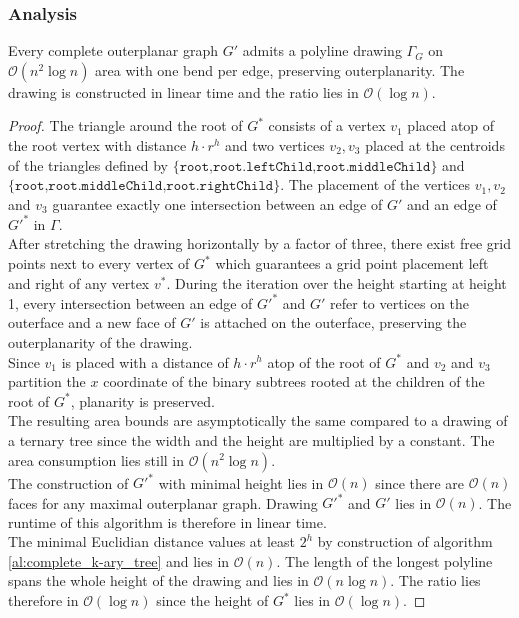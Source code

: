\subsubsection{Analysis}

\begin{theorem}
	Every complete outerplanar graph $G'$ admits a polyline drawing $\Gamma_G$ on $\mathcal{O}(n^2 \log n)$ area with one bend per edge, preserving outerplanarity. The drawing is constructed in linear time and the ratio lies in $\mathcal{O}(\log n)$.
\end{theorem}

\begin{proof}
	The triangle around the root of $G^*$ consists of a vertex $v_1$ placed atop of the root vertex with distance $h\cdot r^h$ and two vertices $v_2,v_3$ placed at the centroids of the triangles defined by $\{\texttt{root,root.leftChild,root.middleChild}\}$ and $\{\texttt{root,root.middleChild,root.rightChild}\}$. The placement of the vertices $v_1,v_2$ and $v_3$ guarantee exactly one intersection between an edge of $G'$ and an edge of $G'^*$ in $\Gamma$.\\
	After stretching the drawing horizontally by a factor of three, there exist free grid points next to every vertex of $G^*$ which guarantees a grid point placement left and right of any vertex $v^*$. During the iteration over the height starting at height 1, every intersection between an edge of $G'^*$ and $G'$ refer to vertices on the outerface and a new face of $G'$ is attached on the outerface, preserving the outerplanarity of the drawing.\\
	Since $v_1$ is placed with a distance of $h\cdot r^h$ atop of the root of $G^*$ and $v_2$ and $v_3$ partition the $x$ coordinate of the binary subtrees rooted at the children of the root of $G^*$, planarity is preserved.\\
	The resulting area bounds are asymptotically the same compared to a drawing of a ternary tree since the width and the height are multiplied by a constant. The area consumption lies still in $\mathcal{O}(n^2 \log n)$.\\
	The construction of $G'^*$ with minimal height lies in $\mathcal{O}(n)$ since there are $\mathcal{O}(n)$ faces for any maximal outerplanar graph. Drawing $G'^*$ and $G'$ lies in $\mathcal{O}(n)$. The runtime of this algorithm is therefore in linear time.\\
	The minimal Euclidian distance values at least $2^h$ by construction of algorithm  \ref{al:complete_k-ary_tree} and lies in $\mathcal{O}(n)$. The length of the longest polyline spans the whole height of the drawing and lies in $\mathcal{O}(n \log n)$. The ratio lies therefore in $\mathcal{O}(\log n)$ since the height of $G^*$ lies in $\mathcal{O}(\log n)$.
\end{proof}
